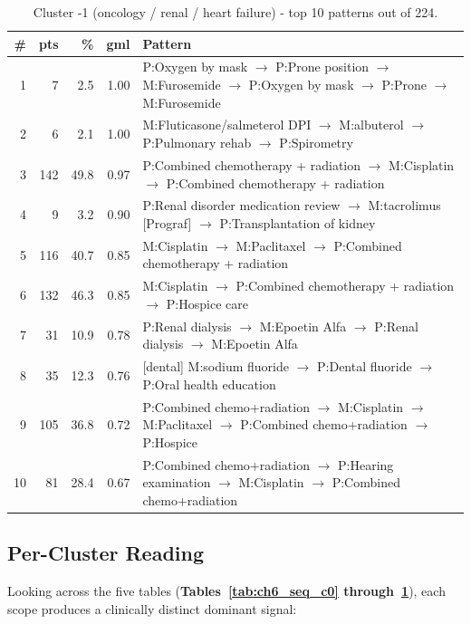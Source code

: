 \begin{table}[H]
\centering
\footnotesize
\renewcommand{\arraystretch}{1.2}
\begin{tabular}{@{}r r r r p{10.5cm}@{}}
\toprule
\textbf{\#} & \textbf{pts} & \textbf{\%} & \textbf{gml} & \textbf{Pattern} \\
\midrule
1  &    7 &  2.5 & 1.00 & P:Oxygen by mask $\to$ P:Prone position $\to$ M:Furosemide $\to$ P:Oxygen by mask $\to$ P:Prone $\to$ M:Furosemide \\
2  &    6 &  2.1 & 1.00 & M:Fluticasone/salmeterol DPI $\to$ M:albuterol $\to$ P:Pulmonary rehab $\to$ P:Spirometry \\
3  &  142 & 49.8 & 0.97 & P:Combined chemotherapy + radiation $\to$ M:Cisplatin $\to$ P:Combined chemotherapy + radiation \\
4  &    9 &  3.2 & 0.90 & P:Renal disorder medication review $\to$ M:tacrolimus [Prograf] $\to$ P:Transplantation of kidney \\
5  &  116 & 40.7 & 0.85 & M:Cisplatin $\to$ M:Paclitaxel $\to$ P:Combined chemotherapy + radiation \\
6  &  132 & 46.3 & 0.85 & M:Cisplatin $\to$ P:Combined chemotherapy + radiation $\to$ P:Hospice care \\
7  &   31 & 10.9 & 0.78 & P:Renal dialysis $\to$ M:Epoetin Alfa $\to$ P:Renal dialysis $\to$ M:Epoetin Alfa \\
8  &   35 & 12.3 & 0.76 & [dental] M:sodium fluoride $\to$ P:Dental fluoride $\to$ P:Oral health education \\
9  &  105 & 36.8 & 0.72 & P:Combined chemo+radiation $\to$ M:Cisplatin $\to$ M:Paclitaxel $\to$ P:Combined chemo+radiation $\to$ P:Hospice \\
10 &   81 & 28.4 & 0.67 & P:Combined chemo+radiation $\to$ P:Hearing examination $\to$ M:Cisplatin $\to$ P:Combined chemo+radiation \\
\bottomrule
\end{tabular}
\caption{Cluster -1 (oncology / renal / heart failure) - top 10 patterns out of 224.}
\label{tab:ch6_seq_outliers}
\end{table}

\subsection{Per-Cluster Reading}

Looking across the five tables (\textbf{Tables~\ref{tab:ch6_seq_c0} through~\ref{tab:ch6_seq_outliers}}), each scope produces a clinically distinct dominant signal:

